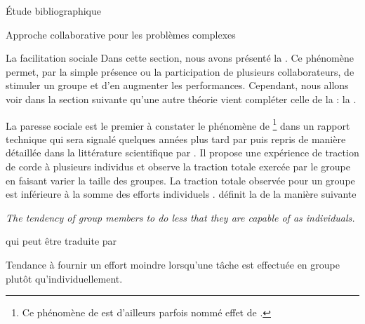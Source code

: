 \documentclass[myfrancais,ngerman,english,frenchb]{mythesis}
\begin{document}
\begin{mychapter}{Étude bibliographique}
\begin{mysection}{Approche collaborative pour les problèmes complexes}
\begin{mysubsection}{La facilitation sociale}
				Dans cette section, nous avons présenté la .
				Ce phénomène permet, par la simple présence ou la participation de plusieurs collaborateurs, de stimuler un groupe et d'en augmenter les performances.
				Cependant, nous allons voir dans la section suivante qu'une autre théorie vient compléter celle de la  : la .
			\end{mysubsection}
			\begin{mysubsection}{La paresse sociale}
				 est le premier à constater le phénomène de \footnote{Ce phénomène de  est d'ailleurs parfois nommé \og effet de  \fg.} dans un rapport technique qui sera signalé quelques années plus tard par  puis repris de manière détaillée dans la littérature scientifique par .
				Il propose une expérience de traction de corde à plusieurs individus et observe la traction totale exercée par le groupe en faisant varier la taille des groupes.
				La traction totale observée pour un groupe est inférieure à la somme des efforts individuels .
				 définit la  de la manière suivante
				\begin{myquote}[english]
					\it The tendency of group members to do less that they are capable of as individuals.
				\end{myquote}
				qui peut être traduite par
				\begin{myquote}[frenchb]
					Tendance à fournir un effort moindre lorsqu'une tâche est effectuée en groupe plutôt qu'individuellement.
				\end{myquote}


\end{mysubsection}
\end{mysection}
\end{mychapter}
\end{document}
